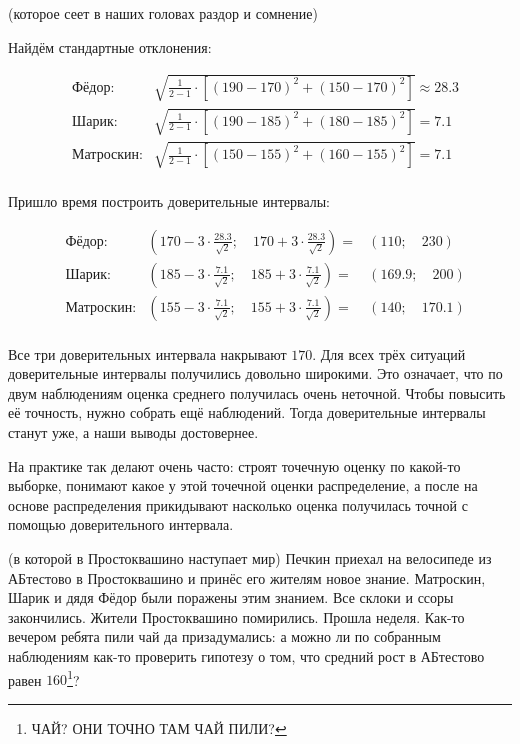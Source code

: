 \documentclass[12pt, a4paper, oneside]{article}
\theoremstyle{plain} %
\theoremstyle{definition}
\begin{document}
\begin{problem}{(которое сеет в наших головах раздор и сомнение)}
\begin{solution}
Найдём стандартные отклонения:

\begin{equation*} 
\begin{aligned} 
& \text{Фёдор:}  & \sqrt{ \frac{1}{2-1} \cdot \left[ (190 - 170)^2 + (150 - 170)^2 \right] } \approx 28.3 \\
& \text{Шарик:}  & \sqrt{ \frac{1}{2-1} \cdot \left[ (190 - 185)^2 + (180 - 185)^2 \right] } = 7.1 \\
& \text{Матроскин:} & \sqrt{ \frac{1}{2-1} \cdot \left[ (150 - 155)^2 + (160 - 155)^2 \right] }= 7.1 \\
\end{aligned}
\end{equation*}

Пришло время построить доверительные интервалы: 

\begin{equation*} 
\begin{aligned} 
& \text{Фёдор:}  & \left( 170 -  3 \cdot \frac{28.3}{\sqrt{2}}; \quad 170 + 3 \cdot \frac{28.3}{\sqrt{2}} \right) = &  (110; \quad 230) \\
& \text{Шарик:}  &  \left( 185 -  3 \cdot \frac{7.1}{\sqrt{2}}; \quad 185 + 3 \cdot \frac{7.1}{\sqrt{2}} \right) = &  (169.9; \quad 200) \\
& \text{Матроскин:} &  \left( 155 -  3 \cdot \frac{7.1}{\sqrt{2}}; \quad 155 + 3 \cdot \frac{7.1}{\sqrt{2}} \right) = &  (140; \quad 170.1) \\
\end{aligned}
\end{equation*}

Все три доверительных интервала накрывают $170$.  Для всех трёх ситуаций доверительные интервалы получились довольно широкими. Это означает, что по двум наблюдениям оценка среднего получилась очень неточной. Чтобы повысить её точность, нужно собрать ещё наблюдений. Тогда доверительные интервалы станут уже, а наши выводы достовернее.

На практике так делают очень часто: строят точечную оценку по какой-то выборке, понимают какое у этой точечной оценки распределение, а после на основе распределения прикидывают насколько оценка получилась точной с помощью доверительного интервала. 
\end{solution}


\begin{problem}{(в которой в Простоквашино наступает мир)}
Печкин приехал на велосипеде из АБтестово в Простоквашино и принёс его жителям новое знание. Матроскин, Шарик и дядя Фёдор были поражены этим знанием. Все склоки и ссоры закончились. Жители Простоквашино помирились. Прошла неделя. Как-то вечером ребята пили чай да призадумались: а можно ли по собранным наблюдениям как-то проверить гипотезу о том, что средний рост в АБтестово равен $160$\footnote{ЧАЙ? ОНИ ТОЧНО ТАМ ЧАЙ ПИЛИ?}? 


\end{problem}
\end{problem}
\end{document}
